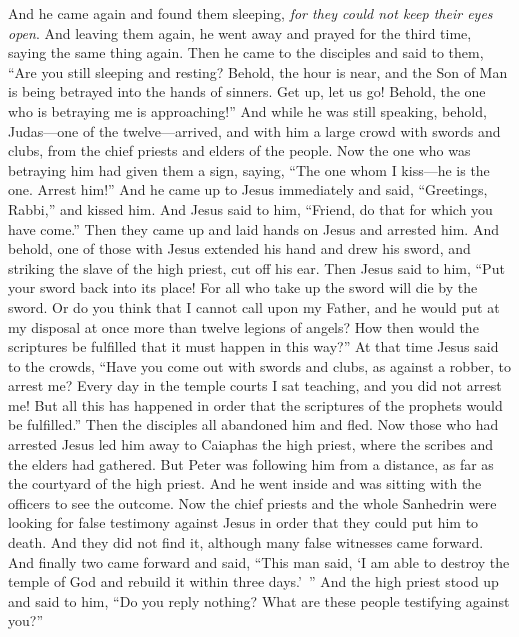 \begin{biblechapter}
\verse And he came again and found them sleeping, \textit{for they could not keep their eyes open}.
\verse And leaving them again, he went away and prayed for the third time, saying the same thing again.
\verse Then he came to the disciples and said to them, “Are you still sleeping and resting? Behold, the hour is near, and the Son of Man is being betrayed into the hands of sinners.
\verse Get up, let us go! Behold, the one who is betraying me is approaching!”
 And while he was still speaking, behold, Judas—one of the twelve—arrived, and with him a large crowd with swords and clubs, from the chief priests and elders of the people.
\verse Now the one who was betraying him had given them a sign, saying, “The one whom I kiss—he is the one. Arrest him!”
\verse And he came up to Jesus immediately and said, “Greetings, Rabbi,” and kissed him.
\verse And Jesus said to him, “Friend, do that for which you have come.” Then they came up and laid hands on Jesus and arrested him.
\verse And behold, one of those with Jesus extended his hand and drew his sword, and striking the slave of the high priest, cut off his ear.
\verse Then Jesus said to him, “Put your sword back into its place! For all who take up the sword will die by the sword.
\verse Or do you think that I cannot call upon my Father, and he would put at my disposal at once more than twelve legions of angels?
\verse How then would the scriptures be fulfilled that it must happen in this way?”
\verse At that time Jesus said to the crowds, “Have you come out with swords and clubs, as against a robber, to arrest me? Every day in the temple courts I sat teaching, and you did not arrest me!
\verse But all this has happened in order that the scriptures of the prophets would be fulfilled.” Then the disciples all abandoned him and fled.
 Now those who had arrested Jesus led him away to Caiaphas the high priest, where the scribes and the elders had gathered.
\verse But Peter was following him from a distance, as far as the courtyard of the high priest. And he went inside and was sitting with the officers to see the outcome.
\verse Now the chief priests and the whole Sanhedrin were looking for false testimony against Jesus in order that they could put him to death.
\verse And they did not find it, although many false witnesses came forward. And finally two came forward
\verse and said, “This man said, ‘I am able to destroy the temple of God and rebuild it within three days.’ ”
\verse And the high priest stood up and said to him, “Do you reply nothing? What are these people testifying against you?”

\end{biblechapter}

